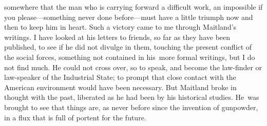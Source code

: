 \documentclass[openany,nobib]{tufte-book}
\begin{document}
somewhere that the man who is carrying forward a difficult work, an
impossible if you please---something never done before---must have a
little triumph now and then to keep him in heart. Such a victory came to
me through Maitland's writings. I have looked at his letters to friends,
so far as they have been published, to see if he did not divulge in
them, touching the present conflict of the social forces, something not
contained in his~more formal writings, but I do not find much. He could
not cross over, so to speak, and become the law-finder or law-speaker of
the Industrial State; to prompt that close contact with the American
environment would have been necessary. But Maitland broke in thought
with the past, liberated as he had been by his historical studies.
He~was brought to see that things are, as never before since the
invention of gunpowder, in a flux that is full of portent for the
future.~~
\end{document}
